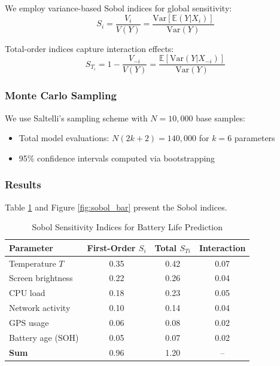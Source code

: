 We employ variance-based Sobol indices for global sensitivity:
\begin{equation}
S_i = \frac{V_i}{V(Y)} = \frac{\text{Var}[\mathbb{E}(Y|X_i)]}{\text{Var}(Y)}
\label{eq:sobol_first}
\end{equation}

Total-order indices capture interaction effects:
\begin{equation}
S_{T_i} = 1 - \frac{V_{-i}}{V(Y)} = \frac{\mathbb{E}[\text{Var}(Y|X_{-i})]}{\text{Var}(Y)}
\label{eq:sobol_total}
\end{equation}

\subsubsection{Monte Carlo Sampling}

We use Saltelli's sampling scheme with $N = 10,000$ base samples:
\begin{itemize}
    \item Total model evaluations: $N(2k+2) = 140,000$ for $k=6$ parameters
    \item 95\% confidence intervals computed via bootstrapping
\end{itemize}

\subsubsection{Results}

Table \ref{tab:sobol_results} and Figure \ref{fig:sobol_bar} present the Sobol indices.

\begin{table}[H]
\centering
\caption{Sobol Sensitivity Indices for Battery Life Prediction}
\label{tab:sobol_results}
\begin{tabular}{lccc}
\toprule
\textbf{Parameter} & \textbf{First-Order $S_i$} & \textbf{Total $S_{Ti}$} & \textbf{Interaction} \\
\midrule
Temperature $T$ & 0.35 & 0.42 & 0.07 \\
Screen brightness & 0.22 & 0.26 & 0.04 \\
CPU load & 0.18 & 0.23 & 0.05 \\
Network activity & 0.10 & 0.14 & 0.04 \\
GPS usage & 0.06 & 0.08 & 0.02 \\
Battery age (SOH) & 0.05 & 0.07 & 0.02 \\
\midrule
\textbf{Sum} & 0.96 & 1.20 & -- \\
\bottomrule
\end{tabular}
\end{table}

